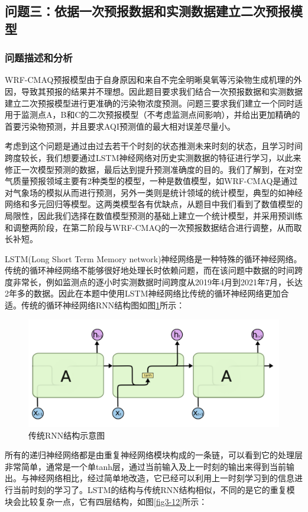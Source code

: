 \documentclass[bwprint]{gmcmthesis}
\numberwithin{figure}{section}
\begin{document}
\subsection{问题三：依据一次预报数据和实测数据建立二次预报模型}
\subsubsection{问题描述和分析}
WRF-CMAQ预报模型由于自身原因和来自不完全明晰臭氧等污染物生成机理的外因，导致其预报的结果并不理想。因此题目要求我们结合一次预报数据和实测数据建立二次预报模型进行更准确的污染物浓度预测。问题三要求我们建立一个同时适用于监测点A，B和C的二次预报模型（不考虑监测点间影响），并给出更加精确的首要污染物预测，并且要求AQI预测值的最大相对误差尽量小。

考虑到这个问题是通过由过去若干个时刻的状态推测未来时刻的状态，且学习时间跨度较长，我们想要通过LSTM神经网络对历史实测数据的特征进行学习，以此来修正一次模型预测的数据，最后达到提升预测准确度的目的。我们了解到，在对空气质量预报领域主要有2种类型的模型，一种是数值模型，如WRF-CMAQ是通过对气象场的模拟从而进行预测，另外一类则是统计领域的统计模型，典型的如神经网络和多元回归等模型。这两类模型各有优缺点，从题目中我们看到了数值模型的局限性，因此我们选择在数值模型预测的基础上建立一个统计模型，并采用预训练和调整两阶段，在第二阶段与WRF-CMAQ的一次预报数据结合进行调整，从而取长补短。

LSTM(Long Short Term Memory network)神经网络是一种特殊的循环神经网络。传统的循环神经网络不能够很好地处理长时依赖问题，而在该问题中数据的时间跨度非常长，例如监测点的逐小时实测数据时间跨度从2019年4月到2021年7月，长达2年多的数据。因此在本题中使用LSTM神经网络比传统的循环神经网络更加合适。传统的循环神经网络RNN结构图如图\ref{fig3-11}所示：

\begin{figure}[!h]
	\centering
	\includegraphics[width=.7\textwidth]{figures//fig3-11.png}
	\caption{传统RNN结构示意图}
	\label{fig3-11}
\end{figure}

所有的递归神经网络都是由重复神经网络模块构成的一条链，可以看到它的处理层非常简单，通常是一个单tanh层，通过当前输入及上一时刻的输出来得到当前输出。与神经网络相比，经过简单地改造，它已经可以利用上一时刻学习到的信息进行当前时刻的学习了。LSTM的结构与传统RNN结构相似，不同的是它的重复模块会比较复杂一点，它有四层结构，如图\ref{fig3-12}所示：
\end{document}
